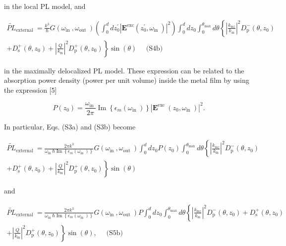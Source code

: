 \documentclass[10pt]{article}
\begin{document}
in the local PL model, and


\begin{gather*}
\widetilde{P L}_{\text {external }}=\frac{k^{3}}{\hbar} G\left(\omega_{\text {in }}, \omega_{\text {out }}\right)\left(\int_{0}^{d} d z_{0}^{\prime}\left|\mathbf{E}^{\mathrm{exc}}\left(z_{0}^{\prime}, \omega_{\text {in }}\right)\right|^{2}\right) \int_{0}^{d} d z_{0} \int_{0}^{\theta_{\max }} d \theta\left\{\left|\frac{k_{\mathrm{m} z}}{k_{\mathrm{m}}}\right|^{2} D_{\mathrm{p}}^{-}\left(\theta, z_{0}\right)\right. \\
\left.+D_{\mathrm{s}}^{+}\left(\theta, z_{0}\right)+\left|\frac{Q}{k_{\mathrm{m}}}\right|^{2} D_{\mathrm{p}}^{+}\left(\theta, z_{0}\right)\right\} \sin (\theta) \quad \text { (S4b) } \tag{S4b}
\end{gather*}


in the maximally delocalized PL model. These expression can be related to the absorption power density (power per unit volume) inside the metal film by using the expression [5]

$$
P\left(z_{0}\right)=\frac{\omega_{\text {in }}}{2 \pi} \operatorname{Im}\left\{\epsilon_{m}\left(\omega_{\text {in }}\right)\right\}\left|\mathbf{E}^{\text {exc }}\left(z_{0}, \omega_{\text {in }}\right)\right|^{2} .
$$

In particular, Eqs. (S3a) and (S3b) become


\begin{gather*}
\widetilde{P L}_{\text {external }}=\frac{2 \pi k^{3}}{\omega_{\text {in }} \hbar \operatorname{Im}\left\{\epsilon_{m}\left(\omega_{\text {in }}\right)\right\}} G\left(\omega_{\text {in }}, \omega_{\text {out }}\right) \int_{0}^{d} d z_{0} P\left(z_{0}\right) \int_{0}^{\theta_{\max }} d \theta\left\{\left|\frac{k_{\mathrm{m} z}}{k_{\mathrm{m}}}\right|^{2} D_{\mathrm{p}}^{-}\left(\theta, z_{0}\right)\right. \\
\left.+D_{\mathrm{s}}^{+}\left(\theta, z_{0}\right)+\left|\frac{Q}{k_{\mathrm{m}}}\right|^{2} D_{\mathrm{p}}^{+}\left(\theta, z_{0}\right)\right\} \sin (\theta) \tag{S5a}
\end{gather*}


and


\begin{gather*}
\widetilde{P L}_{\text {external }}=\frac{2 \pi k^{3}}{\omega_{\text {in }} \hbar \operatorname{Im}\left\{\epsilon_{m}\left(\omega_{\text {in }}\right)\right\}} G\left(\omega_{\text {in }}, \omega_{\text {out }}\right) P \int_{0}^{d} d z_{0} \int_{0}^{\theta_{\max }} d \theta\left\{\left|\frac{k_{\mathrm{m} z}}{k_{\mathrm{m}}}\right|^{2} D_{\mathrm{p}}^{-}\left(\theta, z_{0}\right)+D_{\mathrm{s}}^{+}\left(\theta, z_{0}\right)\right. \\
\left.+\left|\frac{Q}{k_{\mathrm{m}}}\right|^{2} D_{\mathrm{p}}^{+}\left(\theta, z_{0}\right)\right\} \sin (\theta), \quad \text { (S5b) } \tag{S5b}
\end{gather*}
\end{document}
